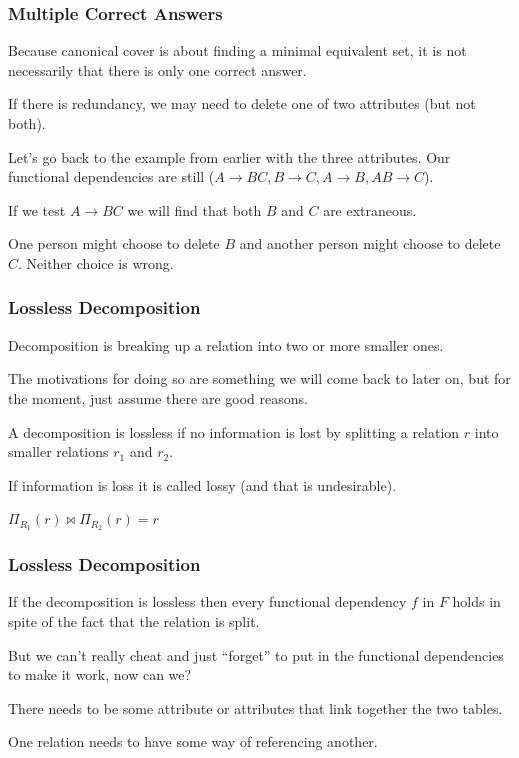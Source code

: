 \begin{frame}
\frametitle{Multiple Correct Answers}

Because canonical cover is about finding a minimal equivalent set, it is not necessarily that there is only one correct answer. 

If there is redundancy, we may need to delete one of two attributes (but not both). 

Let's go back to the example from earlier with the three attributes. Our functional dependencies are still ($A \rightarrow BC, B \rightarrow C, A \rightarrow B, AB \rightarrow C$). 

If we test $A \rightarrow BC$ we will find that both $B$ and $C$ are extraneous. 

One person might choose to delete $B$ and another person might choose to delete $C$. Neither choice is wrong.

\end{frame}



\begin{frame}
\frametitle{Lossless Decomposition}

Decomposition is breaking up a relation into two or more smaller ones. 

The motivations for doing so are something we will come back to later on, but for the moment, just assume there are good reasons. 

A decomposition is \alert{lossless} if no information is lost by splitting a relation $r$ into smaller relations $r_{1}$ and $r_{2}$. 

If information is loss it is called \alert{lossy} (and that is undesirable).

$\Pi_{R_{1}}(r) \bowtie \Pi_{R_{2}}(r) = r$

\end{frame}



\begin{frame}
\frametitle{Lossless Decomposition}

If the decomposition is lossless then every functional dependency $f$ in $F$ holds in spite of the fact that the relation is split. 

But we can't really cheat and just ``forget'' to put in the functional dependencies to make it work, now can we?

There needs to be some attribute or attributes that link together the two tables.

One relation needs to have some way of referencing another.

\end{frame}




